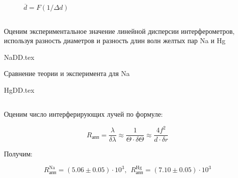 \begin{figure}[h!]
  \caption{$\overline{d} = F(1/\Delta d)$}
  \label{img::avg_diam_na}
\end{figure}

\newpage

\subsection{}

Оценим экспериментальное значение линейной дисперсии интерферометров,
используя разность диаметров и разность длин волн желтых пар Na и Hg

\begin{table}[h!]
  \begin{center}
    {NaDD.tex}
  \end{center}
  \caption{Сравнение теории и эксперимента для Na}
\end{table}

{HgDD.tex}

\subsection{}

Оценим число интерферирующих лучей по формуле:

$$
R_{\text{апп}} =  \frac{\lambda}{\delta \lambda} \approx \frac{1}{\Theta \cdot \delta \Theta} \approx \frac{4 f^2}{d \cdot \delta r}
$$

Получим:

$$
R_{\text{апп}}^{\text{Na}} = (5.06 \pm 0.05 ) \cdot 10^3,
\: \:
R_{\text{апп}}^{\text{Hg}} = (7.10 \pm 0.05 ) \cdot 10^3
$$



